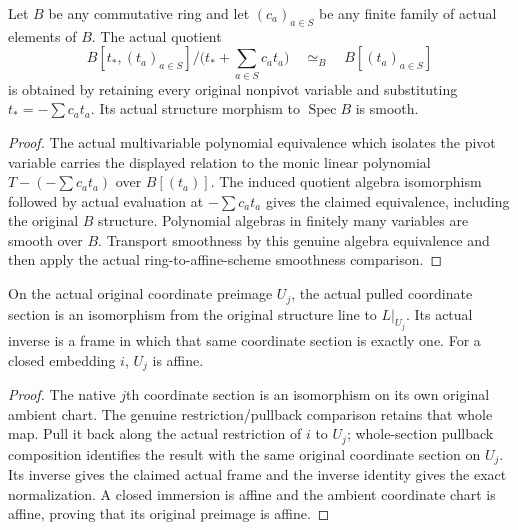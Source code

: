 \begin{lemma}
\label{lem:kn-nadel-bertini-incidence-algebra}

Let $B$ be any commutative ring and let $(c_a)_{a\in S}$ be any finite
family of actual elements of $B$.  The actual quotient
\[
 B[t_*,(t_a)_{a\in S}]/\bigl(t_*+\sum_{a\in S}c_a t_a\bigr)
 \quad\simeq_B\quad B[(t_a)_{a\in S}]
\]
is obtained by retaining every original nonpivot variable and substituting
$t_*=-\sum c_a t_a$.  Its actual structure morphism to
$\operatorname{Spec}B$ is smooth.
\end{lemma}
\begin{proof}
The actual multivariable polynomial equivalence which isolates the pivot
variable carries the displayed relation to the monic linear polynomial
$T-(-\sum c_a t_a)$ over $B[(t_a)]$.  The induced quotient algebra
isomorphism followed by actual evaluation at $-\sum c_a t_a$ gives the
claimed equivalence, including the original $B$ structure.  Polynomial
algebras in finitely many variables are smooth over $B$. Transport
smoothness by this genuine algebra equivalence and then apply the actual
ring-to-affine-scheme smoothness comparison.
\end{proof}

\begin{lemma}
\label{lem:kn-nadel-bertini-projective-coordinate-frame}
\leanok
{}
On the actual original coordinate preimage $U_j$, the actual pulled
coordinate section is an isomorphism from the original structure line to
$L|_{U_j}$. Its actual inverse is a frame in which that same coordinate
section is exactly one. For a closed embedding $i$, $U_j$ is affine.
\end{lemma}
\begin{proof}
The native $j$th coordinate section is an isomorphism on its own original
ambient chart. The genuine restriction/pullback comparison retains that
whole map. Pull it back along the actual restriction of $i$ to $U_j$;
whole-section pullback composition identifies the result with the same
original coordinate section on $U_j$. Its inverse gives the claimed actual
frame and the inverse identity gives the exact normalization. A closed
immersion is affine and the ambient coordinate chart is affine, proving
that its original preimage is affine.
\end{proof}

